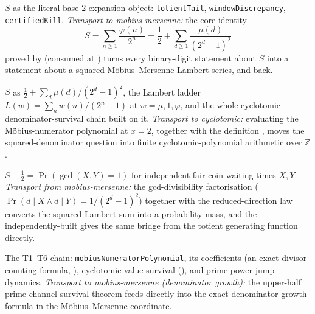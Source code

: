 \begin{description}[leftmargin=*,style=nextline]

\item[binary-digit] $S$ as the literal base-2 expansion object: \texttt{totientTail},
\texttt{windowDiscrepancy}, \texttt{certifiedKill}. \emph{Transport to mobius-mersenne:} the
core identity
\[
  S=\sum_{n\ge1}\frac{\varphi(n)}{2^n}=\frac12+\sum_{d\ge1}\frac{\mu(d)}{(2^d-1)^2}
\]
proved by 
(consumed at )
turns every binary-digit statement about $S$ into a statement about a squared M\"obius--Mersenne
Lambert series, and back.

\item[mobius-mersenne] $S$ as $\tfrac12+\sum_d\mu(d)/(2^d-1)^2$, the Lambert ladder
$L(w)=\sum_n w(n)/(2^n-1)$ at $w=\mu,1,\varphi$, and the whole cyclotomic denominator-survival
chain built on it. \emph{Transport to cyclotomic:} evaluating the M\"obius-numerator polynomial at
$x=2$,
 together with the
definition , moves the squared-denominator
question into finite cyclotomic-polynomial arithmetic over $\mathbb{Z}$.

\item[probability/coprime-pair] $S-\tfrac12=\Pr(\gcd(X,Y)=1)$ for independent fair-coin waiting
times $X,Y$. \emph{Transport from mobius-mersenne:} the gcd-divisibility factorisation
($\Pr(d\mid X\wedge d\mid Y)=1/(2^d-1)^2$) together with the reduced-direction law
 converts the
squared-Lambert sum into a probability mass, and the independently-built
 gives
the same bridge from the totient generating function directly.

\item[cyclotomic] The T1--T6 chain: \texttt{mobiusNumeratorPolynomial}, its coefficients (an exact
divisor-counting formula, ),
cyclotomic-value survival
(), and
prime-power jump dynamics. \emph{Transport to mobius-mersenne (denominator growth):} the upper-half
prime-channel survival theorem
feeds directly into the exact denominator-growth formula
 in the
Möbius--Mersenne coordinate.


\end{description}
